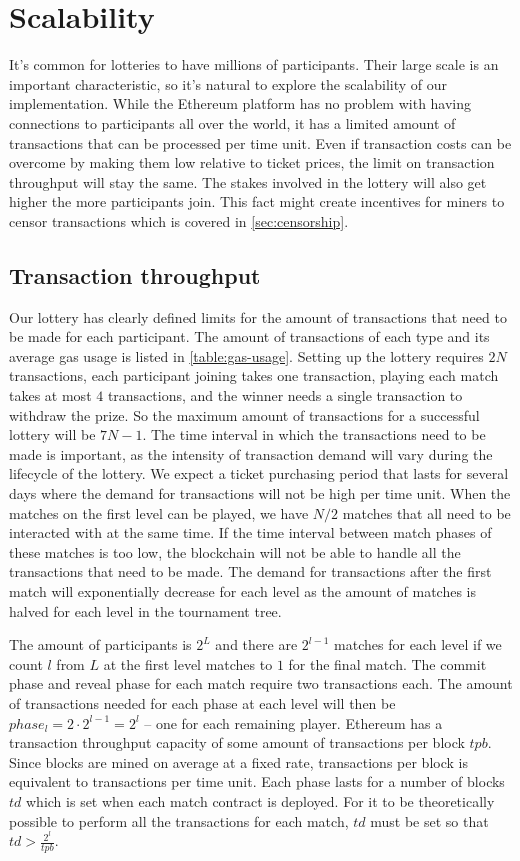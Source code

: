 \section{Scalability}
\label{sec:scalability}

It's common for lotteries to have millions of participants. Their large scale is an important characteristic, so it's natural to explore the scalability of our implementation. While the Ethereum platform has no problem with having connections to participants all over the world, it has a limited amount of transactions that can be processed per time unit. Even if transaction costs can be overcome by making them low relative to ticket prices, the limit on transaction throughput will stay the same. The stakes involved in the lottery will also get higher the more participants join. This fact might create incentives for miners to censor transactions which is covered in \ref{sec:censorship}.

\subsection{Transaction throughput}

Our lottery has clearly defined limits for the amount of transactions that need to be made for each participant. The amount of transactions of each type and its average gas usage is listed in \ref{table:gas-usage}. Setting up the lottery requires $2N$ transactions, each participant joining takes one transaction, playing each match takes at most $4$ transactions, and the winner needs a single transaction to withdraw the prize. So the maximum amount of transactions for a successful lottery will be $7N-1$.  
The time interval in which the transactions need to be made is important, as the intensity of transaction demand will vary during the lifecycle of the lottery. We expect a ticket purchasing period that lasts for several days where the demand for transactions will not be high per time unit. When the matches on the first level can be played, we have $N/2$ matches that all need to be interacted with at the same time. If the time interval between match phases of these matches is too low, the blockchain will not be able to handle all the transactions that need to be made. The demand for transactions after the first match will exponentially decrease for each level as the amount of matches is halved for each level in the tournament tree.

The amount of participants is $2^L$ and there are $2^{l-1}$ matches for each level if we count $l$ from $L$ at the first level matches to $1$ for the final match. The commit phase and reveal phase for each match require two transactions each. The amount of transactions needed for each phase at each level will then be $phase_{l}=2 \cdot 2^{l-1}=2^l$ – one for each remaining player. Ethereum has a transaction throughput capacity of some amount of transactions per block $tpb$. Since blocks are mined on average at a fixed rate, transactions per block is equivalent to transactions per time unit.
Each phase lasts for a number of blocks $td$ which is set when each match contract is deployed. For it to be theoretically possible to perform all the transactions for each match, $td$ must be set so that $td > \frac{2^{l}}{tpb}$.

